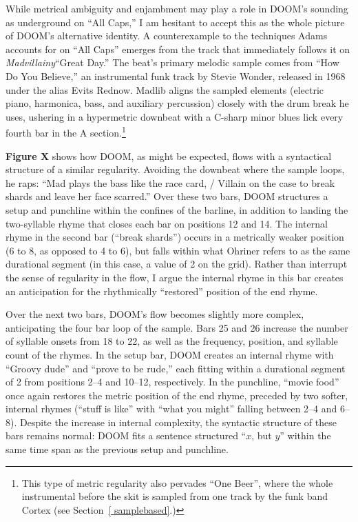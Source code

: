 While metrical ambiguity and enjambment may play a role in DOOM's sounding as underground on ``All Caps,''
I am hesitant to accept this as the whole picture of DOOM's alternative identity. A counterexample to the
techniques Adams accounts for on ``All Caps'' emerges from the track that immediately follows it on 
\textit{Madvillainy}\textemdash ``Great Day.'' The beat's primary melodic sample comes from ``How Do You
Believe,'' an instrumental funk track by Stevie Wonder, released in 1968 under the alias Evits Rednow.
Madlib aligns the sampled elements (electric piano, harmonica, bass, and auxiliary percussion) closely
with the drum break he uses, ushering in a hypermetric downbeat with a C-sharp minor blues lick every
fourth bar in the A section.\footnote{
    This type of metric regularity also pervades ``One Beer'', where the whole instrumental before
    the skit is sampled from one track by the funk band Cortex (see Section~\ref{ samplebased}.)}

\textbf{Figure X} shows how DOOM, as might be expected, flows with a syntactical structure of a 
similar regularity. Avoiding the downbeat where the sample loops, he raps: ``Mad plays the bass like
the race card, / Villain on the case to break shards and leave her face scarred.'' Over these two bars,
DOOM structures a setup and punchline within the confines of the barline, in addition to landing the
two-syllable rhyme that closes each bar on positions 12 and 14. The internal rhyme in the second bar
(``break shards'') occurs in a metrically weaker position (6 to 8, as opposed to 4 to 6), but falls
within what Ohriner refers to as the same durational segment (in this case, a value of 2 on the grid). 
Rather than interrupt the sense of regularity in the flow, I argue the internal rhyme in this bar 
creates an anticipation for the rhythmically ``restored'' position of the end rhyme.

Over the next two bars, DOOM's flow becomes slightly more complex, anticipating the four bar loop
of the sample. Bars 25 and 26 increase the number of syllable onsets from 18 to 22, as well as the 
frequency, position, and syllable count of the rhymes. In the setup bar, DOOM creates an internal 
rhyme with ``Groovy dude'' and ``prove to  be rude,'' each fitting within a durational segment of 2
from positions 2--4 and 10--12, respectively. In the punchline, ``movie food'' once again restores
the metric position of the end rhyme, preceded by two softer, internal rhymes (``stuff is like'' with
``what you might'' falling between 2--4 and 6--8). Despite the increase in internal complexity, the 
syntactic structure of these bars remains normal: DOOM fits a sentence structured ``$x$, but $y$'' 
within the same time span as the previous setup and punchline.

